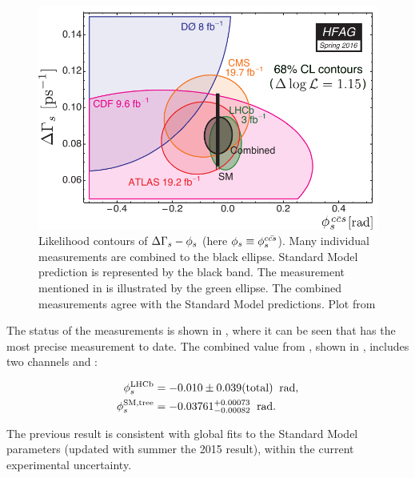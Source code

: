 \begin{figure}[h]
  \centering
    \includegraphics[trim=0cm 0cm 0cm 0cm, clip=true, scale=0.8]{Figures/Chapter1/hfag_Spring2016_DGsphis_zoom.pdf}
    \caption{Likelihood contours of $\Delta\Gamma_s-\phi_{s}$ (here $\phi_{s}\equiv \phi_{s}^{c\bar{cs}}$). Many individual measurements are
             combined to the black ellipse. Standard Model prediction is represented by the black band. The \lhcb measurement
             mentioned in  is illustrated by the green ellipse. The combined measurements agree with the Standard Model
             predictions. Plot from \cite{hfag-2014} }
    \label{hfag_phis_dg}
\end{figure}

The status of the \phis measurements is shown in , where it can be seen that \lhcb has
the most precise measurement to date. The combined \phis value from \lhcb \cite{phis-3fb-paper}, shown in
, includes two channels \BsJpsiPhi and \BsJpsipipi:

\begin{subequations}
  \label{phis_lhcb_theo}
  \begin{align}
  \centering
  \phiS{\lhcb}           &=  -0.010 \pm 0.039(\text{total})  \;\; \text{rad},
  \label{phis_lhcb}\\
  \phiS{SM,tree}  &= -0.03761 {}^{+0.00073}_{-0.00082}  \;\; \text{rad}.
  \label{phis_theo}
\end{align}
\end{subequations}

\noindent The previous result is consistent with global fits to the Standard Model parameters
 \cite{ckm-fitter-phis-pred} (updated with summer the 2015 result), within the current experimental uncertainty.

